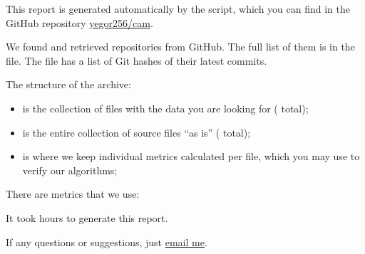\documentclass[nobrand,nosecurity]{huawei}
\begin{document}
\maketitle

This report is generated automatically by the script, which you can find in
the GitHub repository \href{https://github.com/yegor256/cam}{yegor256/cam}.

We found and retrieved 
repositories from GitHub.
The full list of them is in the  file.
The  file has a list of Git hashes of their latest commits.


The structure of the archive:

\begin{itemize}
  \item {} is the collection of  files with the data
  you are looking for ( total);

  \item {} is the entire collection of
  source files ``as is''
  ( total);

  \item {} is where we keep individual metrics calculated
  per file, which you may use to verify our algorithms;
\end{itemize}

There are  metrics that we use:

\begin{itemize}
  
\end{itemize}

It took  hours
to generate this report.

If any questions or suggestions, just \href{mailto:yegor256@gmail.com}{email me}.
\end{document}

